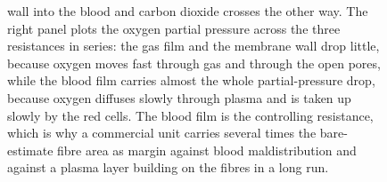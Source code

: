 \begin{figure}[htbp]
{wall into the blood and carbon dioxide crosses the other way. The right
panel plots the oxygen partial pressure across the three resistances in
series: the gas film and the membrane wall drop little, because oxygen
moves fast through gas and through the open pores, while the blood film
carries almost the whole partial-pressure drop, because oxygen diffuses
slowly through plasma and is taken up slowly by the red cells. The blood
film is the controlling resistance, which is why a commercial unit carries
several times the bare-estimate fibre area as margin against blood
maldistribution and against a plasma layer building on the fibres in a
long run.}
\label{fig:vol04ch07:oxygenator}
\end{figure}
